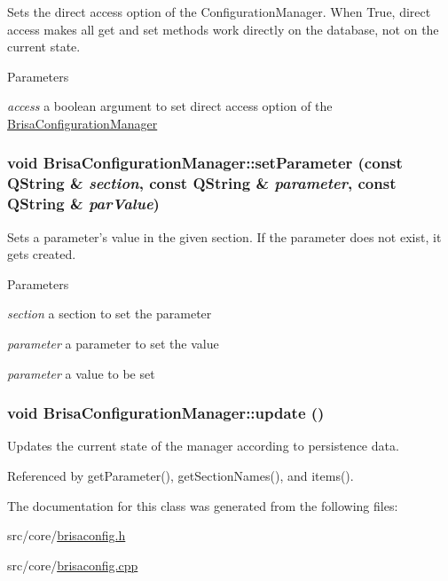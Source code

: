 Sets the direct access option of the ConfigurationManager. When True, direct access makes all get and set methods work directly on the database, not on the current state. 
\begin{DoxyParams}{Parameters}
\item[{\em access}]a boolean argument to set direct access option of the \hyperlink{classBrisaCore_1_1BrisaConfigurationManager}{BrisaConfigurationManager} \end{DoxyParams}
\hypertarget{classBrisaCore_1_1BrisaConfigurationManager_a739851682001ab3417779eaf39f646ec}{
\subsubsection[{setParameter}]{\setlength{\rightskip}{0pt plus 5cm}void BrisaConfigurationManager::setParameter (const QString \& {\em section}, \/  const QString \& {\em parameter}, \/  const QString \& {\em parValue})}}
\label{classBrisaCore_1_1BrisaConfigurationManager_a739851682001ab3417779eaf39f646ec}


Sets a parameter's value in the given section. If the parameter does not exist, it gets created. 
\begin{DoxyParams}{Parameters}
\item[{\em section}]a section to set the parameter \item[{\em parameter}]a parameter to set the value \item[{\em parameter}]a value to be set \end{DoxyParams}
\hypertarget{classBrisaCore_1_1BrisaConfigurationManager_a0e3ce5560d14df248cd95338f83dbb2e}{
\subsubsection[{update}]{\setlength{\rightskip}{0pt plus 5cm}void BrisaConfigurationManager::update ()}}
\label{classBrisaCore_1_1BrisaConfigurationManager_a0e3ce5560d14df248cd95338f83dbb2e}


Updates the current state of the manager according to persistence data. 

Referenced by getParameter(), getSectionNames(), and items().

The documentation for this class was generated from the following files:\begin{DoxyCompactItemize}
\item 
src/core/\hyperlink{brisaconfig_8h}{brisaconfig.h}\item 
src/core/\hyperlink{brisaconfig_8cpp}{brisaconfig.cpp}\end{DoxyCompactItemize}
